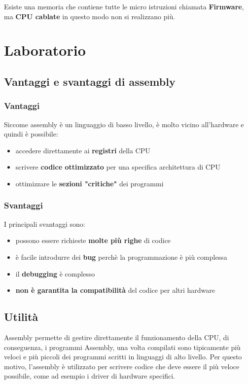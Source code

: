 \documentclass[a4paper]{article}
\theoremstyle{break}
\theoremstyle{break}
\theoremstyle{break}
\theoremstyle{break}
\begin{document}
\noindent Esiste una memoria che contiene tutte le micro istruzioni chiamata \textbf{Firmware},
ma \textbf{CPU cablate} in questo modo non si realizzano più.


\section{Laboratorio}
\subsection{Vantaggi e svantaggi di assembly}
\subsubsection{Vantaggi}
Siccome assembly è un linguaggio di basso livello, è molto vicino all'hardware e quindi è possibile:
\begin{itemize}
	\item accedere direttamente ai \textbf{registri} della CPU
	\item scrivere \textbf{codice ottimizzato} per una specifica architettura di CPU
	\item ottimizzare le \textbf{sezioni "critiche"} dei programmi
\end{itemize}

\subsubsection{Svantaggi}
I principali svantaggi sono:
\begin{itemize}
	\item possono essere richieste \textbf{molte più righe} di codice
	\item è facile introdurre dei \textbf{bug} perchè la programmazione è più complessa
	\item il \textbf{debugging} è complesso
	\item \textbf{non è garantita la compatibilità} del codice per altri hardware
\end{itemize}

\subsection{Utilità}
Assembly permette di gestire direttamente il funzionamento della CPU, di conseguenza,
i programmi Assembly, una volta compilati sono tipicamente più veloci e più piccoli dei
programmi scritti in linguaggi di alto livello. Per questo motivo, l'assembly è utilizzato
per scrivere codice che deve essere il più veloce possibile, come ad esempio i driver di
hardware specifici.
\end{document}
